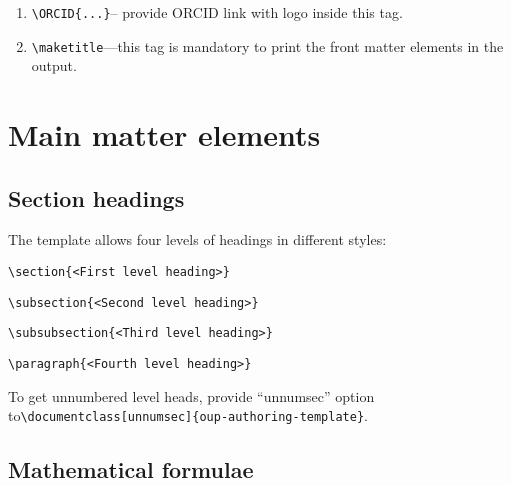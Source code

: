 \documentclass{article}
\begin{document}
\begin{enumerate}
\item \verb+\ORCID{...}+-- provide ORCID link with logo inside this tag.

\item \verb+\maketitle+---this tag is mandatory to print the front matter elements in the output.

\end{enumerate}


\section{Main matter elements }
\subsection{Section headings}
The template allows four levels of headings in different styles:

\medskip

\verb+\section{<First level heading>} +

\verb+\subsection{<Second level heading>} +

\verb+\subsubsection{<Third level heading>}+

\verb+\paragraph{<Fourth level heading>} +

\medskip

\noindent To get unnumbered level heads, provide ``unnumsec'' option to\newline \verb+\documentclass[unnumsec]{oup-authoring-template}+.

\subsection{Mathematical formulae}
\end{document}
